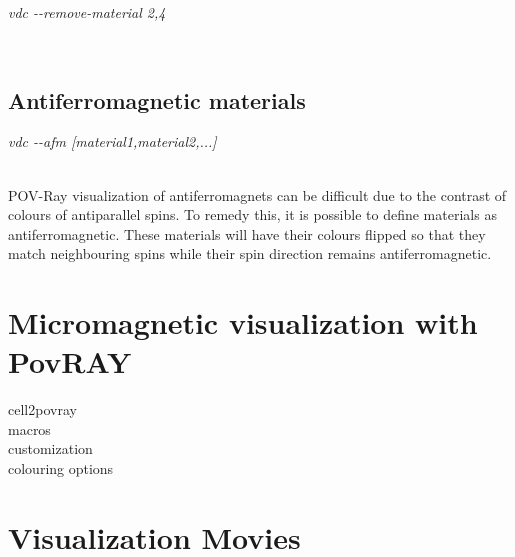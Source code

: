 \begin{minipage}[c]{\textwidth}
\centering
\textit{vdc -{}-remove-material 2,4}
\end{minipage}\\

\subsection*{Antiferromagnetic materials}

\begin{minipage}[c]{\textwidth}
\centering
\textit{vdc -{}-afm [material1,material2,...]}
\end{minipage}\\

POV-Ray visualization of antiferromagnets can be difficult due to the contrast of colours of antiparallel spins. To remedy this, it is possible to define materials as antiferromagnetic. These materials will have their colours flipped so that they match neighbouring spins while their spin direction remains antiferromagnetic.

\section*{Micromagnetic visualization with PovRAY}
cell2povray\\
macros\\
customization\\
colouring options\\

\section*{Visualization Movies}

